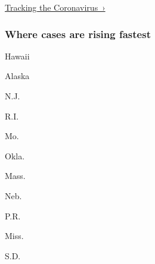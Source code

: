 \href{https://www.nytimes.com/interactive/2020/us/coronavirus-us-cases.html}{Tracking
the Coronavirus~›}

\href{https://www.nytimes.com/interactive/2020/us/coronavirus-us-cases.html}{}

\hypertarget{where-cases-are-rising-fastest}{%
\subsubsection{\texorpdfstring{Where cases are \textbf{rising}
fastest}{Where cases are rising fastest}}\label{where-cases-are-rising-fastest}}

\href{https://www.nytimes.com/interactive/2020/us/hawaii-coronavirus-cases.html}{}

Hawaii

\href{https://www.nytimes.com/interactive/2020/us/alaska-coronavirus-cases.html}{}

Alaska

\href{https://www.nytimes.com/interactive/2020/us/new-jersey-coronavirus-cases.html}{}

N.J.

\href{https://www.nytimes.com/interactive/2020/us/rhode-island-coronavirus-cases.html}{}

R.I.

\href{https://www.nytimes.com/interactive/2020/us/missouri-coronavirus-cases.html}{}

Mo.

\href{https://www.nytimes.com/interactive/2020/us/oklahoma-coronavirus-cases.html}{}

Okla.

\href{https://www.nytimes.com/interactive/2020/us/massachusetts-coronavirus-cases.html}{}

Mass.

\href{https://www.nytimes.com/interactive/2020/us/nebraska-coronavirus-cases.html}{}

Neb.

\href{https://www.nytimes.com/interactive/2020/us/puerto-rico-coronavirus-cases.html}{}

P.R.

\href{https://www.nytimes.com/interactive/2020/us/mississippi-coronavirus-cases.html}{}

Miss.

\href{https://www.nytimes.com/interactive/2020/us/south-dakota-coronavirus-cases.html}{}

S.D.

\href{https://www.nytimes.com/interactive/2020/us/illinois-coronavirus-cases.html}{}


